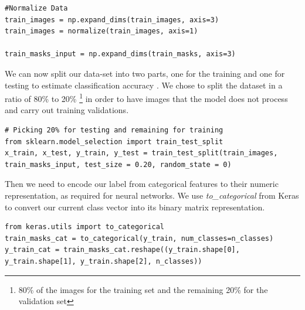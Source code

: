 \documentclass[12pt,a4paper]{scrartcl}
\begin{document}
\begin{lstlisting}[caption={Normalize the data, the code can be found in the \emph{train.py} file}]
#Normalize Data
train_images = np.expand_dims(train_images, axis=3)
train_images = normalize(train_images, axis=1)

train_masks_input = np.expand_dims(train_masks, axis=3)
\end{lstlisting}

We can now split our data-set into two parts, one for the training and one for testing to estimate classification accuracy \cite{DatasetSplitting:2011}. We chose to split the dataset in a ratio of 80\% to 20\% \footnote{80\% of the images for the training set and the remaining 20\% for the validation set} in order to have images that the model does not process and carry out training validations.
\begin{lstlisting}[caption={Dataset split for testing and training from the \emph{train.py} file}, label={lst:data-split}]
# Picking 20% for testing and remaining for training
from sklearn.model_selection import train_test_split
x_train, x_test, y_train, y_test = train_test_split(train_images, train_masks_input, test_size = 0.20, random_state = 0) 
\end{lstlisting}

Then we need to encode our label from categorical features to their numeric representation, as required for neural networks. We use \emph{to\_categorical} from Keras \cite{chollet2015keras} to convert our current class vector into its binary matrix representation.

\begin{lstlisting}[caption={Data conversion into categorical, code belongs in the \emph{train.py} file}, label={lst:data-categorical}]
from keras.utils import to_categorical
train_masks_cat = to_categorical(y_train, num_classes=n_classes)
y_train_cat = train_masks_cat.reshape((y_train.shape[0], y_train.shape[1], y_train.shape[2], n_classes))
\end{lstlisting}
\end{document}
